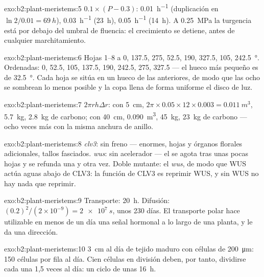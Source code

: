 \begin{solution}{exo:b2:plant-meristems:5}
$0.1\times(P - 0.3)$: \qty{0.01}{h^{-1}} (duplicación en $\ln 2/0.01 =
\qty{69}{h}$), \qty{0.03}{h^{-1}} (\qty{23}{h}), \qty{0.05}{h^{-1}}
(\qty{14}{h}). A \qty{0.25}{MPa} la turgencia está por debajo del umbral
de fluencia: el crecimiento se detiene, antes de cualquier marchitamiento.
\end{solution}

\begin{solution}{exo:b2:plant-meristems:6}
Hojas 1--8 a 0, 137.5, 275, 52.5, 190, 327.5, 105, \qty{242.5}{\degree}.
Ordenadas: 0, 52.5, 105, 137.5, 190, 242.5, 275, 327.5 --- el hueco más
pequeño es de \qty{32.5}{\degree}. Cada hoja se sitúa en un hueco de las
anteriores, de modo que las ocho se sombrean lo menos posible y la copa
llena de forma uniforme el disco de luz.
\end{solution}

\begin{solution}{exo:b2:plant-meristems:7}
$2\pi r h\Delta r$: con \qty{5}{cm}, $2\pi\times 0.05\times 12\times
0.003 = \qty{0.011}{m^3}$, \qty{5.7}{kg}, \qty{2.8}{kg} de carbono; con
\qty{40}{cm}, \qty{0.090}{m^3}, \qty{45}{kg}, \qty{23}{kg} de carbono
--- ocho veces más con la misma anchura de anillo.
\end{solution}

\begin{solution}{exo:b2:plant-meristems:8}
\emph{clv3}: sin freno ---  enormes, hojas y órganos florales
adicionales, tallos fasciados. \emph{wus}: sin acelerador --- el 
se agota tras unas pocas hojas y se refunda una y otra vez. Doble
mutante: el  \emph{wus}, de modo que WUS actúa aguas abajo de
CLV3: la función de CLV3 es reprimir WUS, y sin WUS no hay nada que
reprimir.
\end{solution}

\begin{solution}{exo:b2:plant-meristems:9}
Transporte: \qty{20}{h}. Difusión: $(0.2)^{2}/(2\times 10^{-9}) =
\qty{2e7}{s}$, unos 230 días. El transporte polar hace utilizable en menos
de un día una señal hormonal a lo largo de una planta, y le da una
dirección.
\end{solution}

\begin{solution}{exo:b2:plant-meristems:10}
\qty{3}{cm} al día de tejido maduro con células de \qty{200}{\micro m}:
\num{150} células por fila al día. Cien células en división deben, por
tanto, dividirse cada una 1,5 veces al día: un ciclo de unas \qty{16}{h}.
\end{solution}

